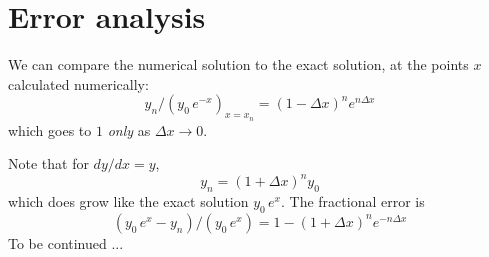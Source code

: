 \documentclass[12pt]{article}
\begin{document}
\section{Error analysis}
 We can compare the numerical solution to the exact solution, at the points $x$ calculated numerically:
\begin{equation}
y_n/(y_0\, e^{-x})_{x=x_n} = (1-\Delta x)^n e^{n\Delta x}
\end{equation}
which goes to $1$ {\it only} as $\Delta x\to 0$. 

Note that for $dy/dx = y$, 
\begin{equation}
y_n = (1+\Delta x)^n y_0
\end{equation}
which does grow like the exact solution $y_0 \, e^x$. The fractional error is
\begin{equation}
(y_0\, e^x - y_n)/(y_0\, e^x) = 1 - (1+\Delta x)^n e^{-n \Delta x}
\end{equation}
To be continued ... 
\end{document}
